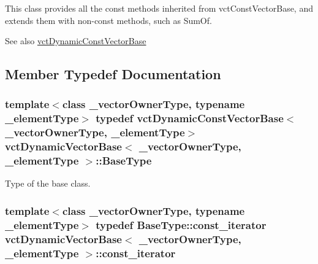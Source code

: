 This class provides all the const methods inherited from vct\+Const\+Vector\+Base, and extends them with non-\/const methods, such as Sum\+Of.

\begin{DoxySeeAlso}{See also}
\hyperlink{classvct_dynamic_const_vector_base}{vct\+Dynamic\+Const\+Vector\+Base} 
\end{DoxySeeAlso}


\subsection{Member Typedef Documentation}
\hypertarget{classvct_dynamic_vector_base_a773a8005371ea8d078a842eff2cb719f}{}
\subsubsection[{Base\+Type}]{\setlength{\rightskip}{0pt plus 5cm}template$<$class \+\_\+vector\+Owner\+Type, typename \+\_\+element\+Type$>$ typedef {\bf vct\+Dynamic\+Const\+Vector\+Base}$<$\+\_\+vector\+Owner\+Type, \+\_\+element\+Type$>$ {\bf vct\+Dynamic\+Vector\+Base}$<$ \+\_\+vector\+Owner\+Type, \+\_\+element\+Type $>$\+::{\bf Base\+Type}}\label{classvct_dynamic_vector_base_a773a8005371ea8d078a842eff2cb719f}
Type of the base class. \hypertarget{classvct_dynamic_vector_base_adf3a8f5fcdecc355b9930fa2166e3fb6}{}
\subsubsection[{const\+\_\+iterator}]{\setlength{\rightskip}{0pt plus 5cm}template$<$class \+\_\+vector\+Owner\+Type, typename \+\_\+element\+Type$>$ typedef {\bf Base\+Type\+::const\+\_\+iterator} {\bf vct\+Dynamic\+Vector\+Base}$<$ \+\_\+vector\+Owner\+Type, \+\_\+element\+Type $>$\+::{\bf const\+\_\+iterator}}\label{classvct_dynamic_vector_base_adf3a8f5fcdecc355b9930fa2166e3fb6}
\hypertarget{classvct_dynamic_vector_base_a19db937e3f8b2fdc7c7d6e720c2bc9b3}{}

